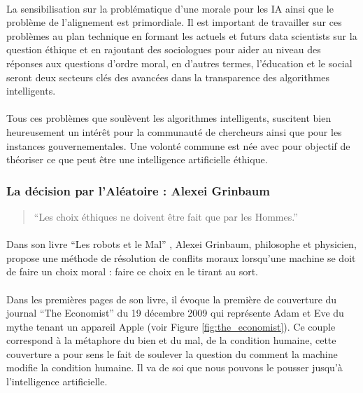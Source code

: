 \documentclass[10pt, french, a4paper]{report}
\begin{document}
\paragraph{}
La sensibilisation sur la problématique d’une morale pour les IA ainsi que le problème de l’alignement est primordiale. Il est important de travailler sur ces problèmes au plan technique en formant les actuels et futurs data scientists sur la question éthique et en rajoutant des sociologues pour aider au niveau des réponses aux questions d'ordre moral, en d’autres termes, l’éducation et le social seront deux secteurs clés des avancées dans la transparence des algorithmes intelligents.

\paragraph{}
Tous ces problèmes que soulèvent les algorithmes intelligents, suscitent bien heureusement un intérêt pour la communauté de chercheurs ainsi que pour les instances gouvernementales. Une volonté commune est née avec pour objectif de théoriser ce que peut être une intelligence artificielle éthique.

\subsubsection{La décision par l'Aléatoire : Alexei Grinbaum}

\begin{quotation}
  ``Les choix éthiques ne doivent être fait que par les Hommes.''
\end{quotation}

\paragraph{}
Dans son livre ``Les robots et le Mal'' \citep{grinbaum_les_2019}, Alexei Grinbaum, philosophe et physicien, propose une méthode de résolution de conflits moraux lorsqu'une machine se doit de faire un choix moral : faire ce choix en le tirant au sort.

\paragraph{}
Dans les premières pages de son livre, il évoque la première de couverture du journal ``The Economist'' du 19 décembre 2009 qui représente Adam et Eve du mythe tenant un appareil Apple (voir Figure \ref{fig:the_economist}). Ce couple correspond à la métaphore du bien et du mal, de la condition humaine, cette couverture a pour sens le fait de soulever la question du comment la machine modifie la condition humaine. Il va de soi que nous pouvons le pousser jusqu'à l'intelligence artificielle.
\end{document}
